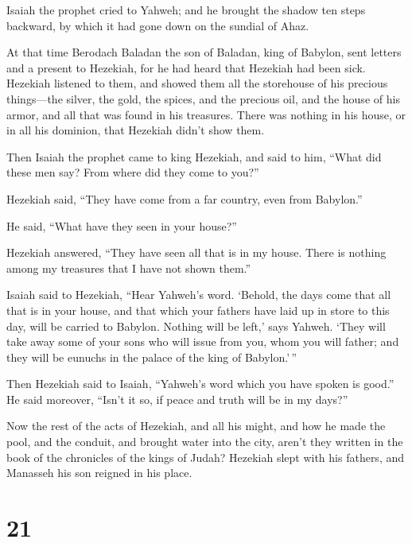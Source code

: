  Isaiah the prophet cried to Yahweh; and he brought the
shadow ten steps backward, by which it had gone down on the sundial of
Ahaz.

 At that time Berodach Baladan the son of Baladan, king of
Babylon, sent letters and a present to Hezekiah, for he had heard that
Hezekiah had been sick.  Hezekiah listened to them, and
showed them all the storehouse of his precious things---the silver, the
gold, the spices, and the precious oil, and the house of his armor, and
all that was found in his treasures. There was nothing in his house, or
in all his dominion, that Hezekiah didn't show them.

 Then Isaiah the prophet came to king Hezekiah, and said to
him, ``What did these men say? From where did they come to you?''

Hezekiah said, ``They have come from a far country, even from Babylon.''

 He said, ``What have they seen in your house?''

Hezekiah answered, ``They have seen all that is in my house. There is
nothing among my treasures that I have not shown them.''

 Isaiah said to Hezekiah, ``Hear Yahweh's word.
 `Behold, the days come that all that is in your house, and
that which your fathers have laid up in store to this day, will be
carried to Babylon. Nothing will be left,' says Yahweh. 
`They will take away some of your sons who will issue from you, whom you
will father; and they will be eunuchs in the palace of the king of
Babylon.'\,''

 Then Hezekiah said to Isaiah, ``Yahweh's word which you
have spoken is good.'' He said moreover, ``Isn't it so, if peace and
truth will be in my days?''

 Now the rest of the acts of Hezekiah, and all his might,
and how he made the pool, and the conduit, and brought water into the
city, aren't they written in the book of the chronicles of the kings of
Judah?  Hezekiah slept with his fathers, and Manasseh his
son reigned in his place.

\hypertarget{section-20}{%
\section{21}\label{section-20}}

